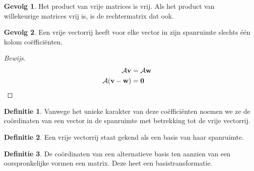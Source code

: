 \documentclass{amsart}
\theoremstyle{definition}
\newtheorem{dfn}{Definitie}[section]
\newtheorem{csq}{Gevolg}[section]
\newenvironment{bewijs}{\begin{proof}[Bewijs]}{\end{proof}}
\newcommand{\vvec}[1][v]{\mathbf{#1}}
\newcommand{\zerovec}{\vvec[0]}
\newcommand{\vecrow}[1][a]{\mathcal{\MakeUppercase{#1}}}
\begin{document}
\begin{csq}
	Het product van vrije matrices is vrij. Als het product van willekeurige matrices vrij is, is de rechtermatrix dat ook.
\end{csq}

\begin{csq}
	Een vrije vectorrij heeft voor elke vector in zijn spanruimte slechts één kolom coëfficiënten.
	\begin{bewijs}
		\begin{align*}
			\vecrow \vvec                 & = \vecrow \vvec[w] \\
			\vecrow (\vvec - \vvec[w]) & = \zerovec
		\end{align*}
	\end{bewijs}
\end{csq}

\begin{dfn}
	Vanwege het unieke karakter van deze coëfficiënten noemen we ze de coördinaten van een vector in de spanruimte met betrekking tot de vrije vectorrij.
\end{dfn}

\begin{dfn}
	Een vrije vectorrij staat gekend als een basis van haar spanruimte.
\end{dfn}

\begin{dfn}
	De coördinaten van een alternatieve basis ten aanzien van een oorspronkelijke vormen een matrix.
	Deze heet een basistransformatie.
\end{dfn}
\end{document}
